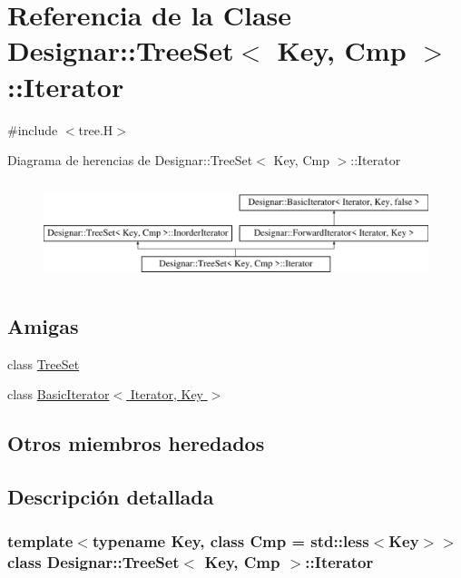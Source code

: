 \hypertarget{class_designar_1_1_tree_set_1_1_iterator}{}\section{Referencia de la Clase Designar\+:\+:Tree\+Set$<$ Key, Cmp $>$\+:\+:Iterator}
\label{class_designar_1_1_tree_set_1_1_iterator}


{\ttfamily \#include $<$tree.\+H$>$}

Diagrama de herencias de Designar\+:\+:Tree\+Set$<$ Key, Cmp $>$\+:\+:Iterator\begin{figure}[H]
\begin{center}
\leavevmode
\includegraphics[height=2.916667cm]{class_designar_1_1_tree_set_1_1_iterator}
\end{center}
\end{figure}
\subsection*{Amigas}
\begin{DoxyCompactItemize}
\item 
class \hyperlink{class_designar_1_1_tree_set_1_1_iterator_a7caa42294700d2a60905ec3458a7cd8a}{Tree\+Set}
\item 
class \hyperlink{class_designar_1_1_tree_set_1_1_iterator_a0b375a570add16b09037ce1773f0ddbb}{Basic\+Iterator$<$ Iterator, Key $>$}
\end{DoxyCompactItemize}
\subsection*{Otros miembros heredados}


\subsection{Descripción detallada}
\subsubsection*{template$<$typename Key, class Cmp = std\+::less$<$\+Key$>$$>$\newline
class Designar\+::\+Tree\+Set$<$ Key, Cmp $>$\+::\+Iterator}



